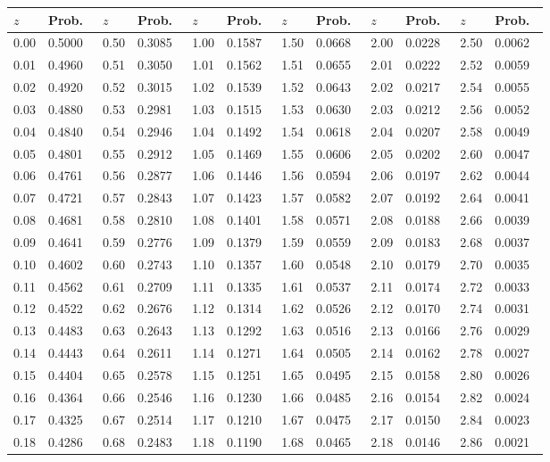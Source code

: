 {\small
\begin{tabular}{|ll|ll|ll|ll|ll|ll|}\hline
$z$ & Prob.\ & $z$ & Prob.\ & $z$ & Prob.\ & $z$ & Prob.\ & $z$ & Prob.\ & $z$ & Prob.\ \\ \hline
 0.00 & 0.5000 & 0.50 & 0.3085& 1.00 & 0.1587& 1.50 & 0.0668& 2.00 & 0.0228&2.50 &0.0062\\
 0.01 & 0.4960 & 0.51 & 0.3050& 1.01 & 0.1562& 1.51 & 0.0655& 2.01 & 0.0222&2.52 &0.0059\\
 0.02 & 0.4920 & 0.52 & 0.3015& 1.02 & 0.1539& 1.52 & 0.0643& 2.02 & 0.0217&2.54 &0.0055\\
 0.03 & 0.4880 & 0.53 & 0.2981& 1.03 & 0.1515& 1.53 & 0.0630& 2.03 & 0.0212&2.56 &0.0052\\
 0.04 & 0.4840 & 0.54 & 0.2946& 1.04 & 0.1492& 1.54 & 0.0618& 2.04 & 0.0207&2.58 &0.0049\\
 0.05 & 0.4801 & 0.55 & 0.2912& 1.05 & 0.1469& 1.55 & 0.0606& 2.05 & 0.0202&2.60 &0.0047\\
 0.06 & 0.4761 & 0.56 & 0.2877& 1.06 & 0.1446& 1.56 & 0.0594& 2.06 & 0.0197&2.62 &0.0044\\
 0.07 & 0.4721 & 0.57 & 0.2843& 1.07 & 0.1423& 1.57 & 0.0582& 2.07 & 0.0192&2.64 &0.0041\\
 0.08 & 0.4681 & 0.58 & 0.2810& 1.08 & 0.1401& 1.58 & 0.0571& 2.08 & 0.0188&2.66 &0.0039\\
 0.09 & 0.4641 & 0.59 & 0.2776& 1.09 & 0.1379& 1.59 & 0.0559& 2.09 & 0.0183&2.68 &0.0037\\
 0.10 & 0.4602 & 0.60 & 0.2743& 1.10 & 0.1357& 1.60 & 0.0548& 2.10 & 0.0179&2.70 &0.0035\\
 0.11 & 0.4562 & 0.61 & 0.2709& 1.11 & 0.1335& 1.61 & 0.0537& 2.11 & 0.0174&2.72 &0.0033\\
 0.12 & 0.4522 & 0.62 & 0.2676& 1.12 & 0.1314& 1.62 & 0.0526& 2.12 & 0.0170&2.74 &0.0031\\
 0.13 & 0.4483 & 0.63 & 0.2643& 1.13 & 0.1292& 1.63 & 0.0516& 2.13 & 0.0166&2.76 &0.0029\\
 0.14 & 0.4443 & 0.64 & 0.2611& 1.14 & 0.1271& 1.64 & 0.0505& 2.14 & 0.0162&2.78 &0.0027\\
 0.15 & 0.4404 & 0.65 & 0.2578& 1.15 & 0.1251& 1.65 & 0.0495& 2.15 & 0.0158&2.80 &0.0026\\
 0.16 & 0.4364 & 0.66 & 0.2546& 1.16 & 0.1230& 1.66 & 0.0485& 2.16 & 0.0154&2.82 &0.0024\\
 0.17 & 0.4325 & 0.67 & 0.2514& 1.17 & 0.1210& 1.67 & 0.0475& 2.17 & 0.0150&2.84 &0.0023\\
 0.18 & 0.4286 & 0.68 & 0.2483& 1.18 & 0.1190& 1.68 & 0.0465& 2.18 & 0.0146&2.86 &0.0021\\

\end{tabular}}
